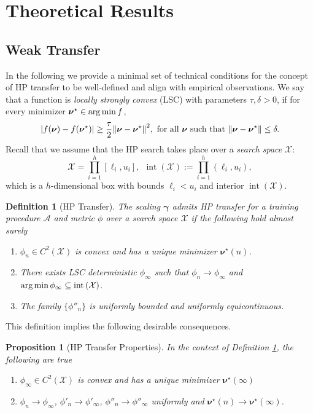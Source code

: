 \documentclass{article} %
\newtheorem{proposition}[theorem]{Proposition}
\newtheorem{definition}{Definition}
\newcommand{\bhp}{\bm{\nu}}                       %
\newcommand{\bhpexp}{\bm{\gamma}}                 %
\newcommand{\searchspace}{\mathcal{X}}            %
\newcommand{\lb}{\ell}
\newcommand{\ub}{u}
\newcommand{\interior}[1]{\operatorname{int}\left(#1\right)}
\newcommand{\growthconst}{\tau}
\newcommand{\growthrad}{\delta}
\newcommand{\numhps}{h}
\newcommand{\algo}{\mathcal{A}}
\begin{document}
\newpage

\section{Theoretical Results}
\subsection{Weak Transfer}\label{app:weak_transfer}
In the following we provide a minimal set of technical conditions for the concept of HP transfer to be well-defined and align with empirical observations. We say that a function is \textit{locally strongly convex} (LSC) with parameters $\growthconst, \growthrad > 0$, if for every minimizer $\bhp^\star \in \argmin f$,
\[
    |f(\bhp) - f(\bhp^\star)| \geq \frac{\growthconst}{2} \norm{\bhp - \bhp^\star}^{2},~ \text{for all } \bhp \text{ such that } \norm{\bhp - \bhp^\star} \leq \delta.
\]
Recall that we assume that the HP search takes place over a \emph{search space} $\searchspace$:
\[
   \searchspace = \prod\limits_{i=1}^{\numhps} [\lb_i, \ub_i],~~\interior{\searchspace} := \prod\limits_{i=1}^{\numhps} (\lb_i, \ub_i),
\]
which is a $\numhps$-dimensional box with bounds $\lb_i < \ub_i$ and interior $\interior{\searchspace}$. 
\begin{definition}[HP Transfer]\label{def:hp_transfer}
    The scaling $\bhpexp$ admits \textit{HP transfer} for a training procedure $\algo$ and metric $\phi$ over a search space $\searchspace$ if the following hold almost surely
    \begin{enumerate} 
        \item $\phi_n \in C^2(\searchspace)$ is convex and has a unique minimizer $\bhp^\star(n)$.

        \item There exists LSC deterministic $\phi_\infty$ such that $\phi_n \to \phi_{\infty}$ and $\argmin \phi_\infty \subseteq \interior{\searchspace}$.

        \item The family $\{\phi''_n\}$ is uniformly bounded and uniformly equicontinuous.
    \end{enumerate}    
\end{definition}
This definition implies the following desirable consequences. 
\begin{proposition}[HP Transfer Properties]\label{prop:hp_transfer_properties}
    In the context of Definition \ref{def:hp_transfer}, the following are true
    \begin{enumerate}
        \item $\phi_\infty \in C^2(\searchspace)$ is convex and has a unique minimizer $\bhp^\star(\infty)$
        
        \item $\phi_n \to \phi_\infty$, $\phi'_n \to \phi'_\infty$, $\phi''_n \to \phi''_\infty$ uniformly and $\bhp^\star(n) \to \bhp^\star(\infty)$.
    \end{enumerate}
\end{proposition}
\end{document}
